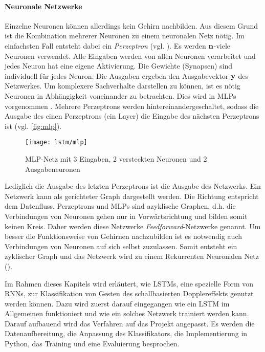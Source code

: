 \paragraph{Neuronale Netzwerke}
Einzelne Neuronen können allerdings kein Gehirn nachbilden. Aus diesem Grund ist
die Kombination mehrerer Neuronen zu einem neuronalen Netz nötig. Im einfachsten
Fall entsteht dabei ein \textit{Perzeptron} (vgl.
\cite{rosenblatt58a,1165576}). Es werden $\bf n$-viele Neuronen verwendet. Alle
Eingaben werden von allen Neuronen verarbeitet und jedes Neuron hat eine eigene
Aktivierung. Die Gewichte (Synapsen) sind individuell für jedes Neuron. Die
Ausgaben ergeben den Ausgabevektor $\bf{y}$ des Netzwerkes. Um komplexere
Sachverhalte darstellen zu können, ist es nötig Neuronen in Abhängigkeit
voneinander zu betrachten. Dies wird in \acp{MLP} vorgenommen \cite{1165576}.
Mehrere Perzeptrons werden hintereinandergeschaltet, sodass die Ausgabe des
einen Perzeptrons (ein Layer) die Eingabe des nächsten Perzeptrons ist (vgl.
\autoref{fig:mlp}).
\begin{figure}[htbp]
    \centering
   \texttt{[image: lstm/mlp]}
\caption[\acs{MLP}-Netz]{MLP-Netz mit 3 Eingaben, 2 versteckten Neuronen und 2 Ausgabeneuronen}
\label{fig:mlp}
\end{figure}
Lediglich die Ausgabe des letzten Perzeptrons ist die Ausgabe des Netzwerks.
Ein Netzwerk kann als gerichteter Graph dargestellt werden. Die Richtung
entspricht dem Datenfluss. Perzeptrons und \acp{MLP} sind azyklische Graphen,
d.h. die Verbindungen von Neuronen gehen nur in Vorwärtsrichtung und bilden
somit keinen Kreis. Daher werden diese Netzwerke \textit{Feedforward}-Netzwerke
genannt. Um besser die Funktionsweise von Gehirnen nachzubilden ist es notwendig
auch Verbindungen von Neuronen auf sich selbst zuzulassen. Somit entsteht ein
zyklischer Graph und das Netzwerk wird zu einem Rekurrenten Neuronalen Netz
(). \cite{RainerSchmoll2006}

Im Rahmen dieses Kapitels wird erläutert, wie \acsp{LSTM}, eine spezielle Form
von \acp{RNN}, zur Klassifikation von Gesten des schallbasierten Dopplereffekts
genutzt werden können. Dazu wird zuerst darauf eingegangen wie ein \ac{LSTM} im
Allgemeinen funktioniert und wie ein solches Netzwerk trainiert werden kann.
Darauf aufbauend wird das Verfahren auf das Projekt angepasst. Es werden die
Datenaufbereitung, die Anpassung des Klassifikators, die Implementierung in
Python, das Training und eine Evaluierung besprochen.



